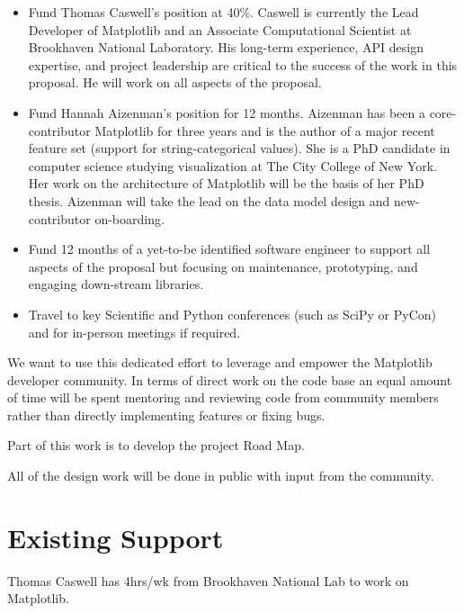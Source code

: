 \documentclass[11pt]{article}  %
\begin{document}
\begin{itemize}[noitemsep]

\item Fund Thomas Caswell's position at 40\%.  Caswell is
  currently the Lead Developer of Matplotlib and an Associate
  Computational Scientist at Brookhaven National Laboratory.  His
  long-term experience, API design expertise, and project leadership
  are critical to the success of the work in this proposal.  He will work
  on all aspects of the proposal.
\item Fund Hannah Aizenman's position for 12 months.  Aizenman has
  been a core-contributor Matplotlib for three years and is the author
  of a major recent feature set (support for string-categorical
  values).  She is a PhD candidate in computer science studying
  visualization at The City College of New York.  Her work on the
  architecture of Matplotlib will be the basis of her PhD thesis.
  Aizenman will take the lead on the data model design and
  new-contributor on-boarding.
\item Fund 12 months of a yet-to-be identified software engineer to
  support all aspects of the proposal but focusing on maintenance,
  prototyping, and engaging down-stream libraries.
\item Travel to key Scientific and Python conferences (such as SciPy
  or PyCon) and for in-person meetings if required.
\end{itemize}

We want to use this dedicated effort to leverage and empower the
Matplotlib developer community.  In terms of direct work on the code
base an equal amount of time will be spent mentoring and reviewing
code from community members rather than directly implementing features
or fixing bugs.

Part of this work is to develop the project Road Map.

All of the design work will be done in public with input from the
community.


\section{Existing Support}

Thomas Caswell has 4hrs/wk from Brookhaven National Lab to work on
Matplotlib.


\clearpage

\end{document}
